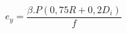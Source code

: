 \documentclass[12pt]{article}
\begin{document}
\begin{displaymath}
e_y = \frac {\beta . P (0,75R + 0,2D_i)} {f}
\end{displaymath}
\end{document}
